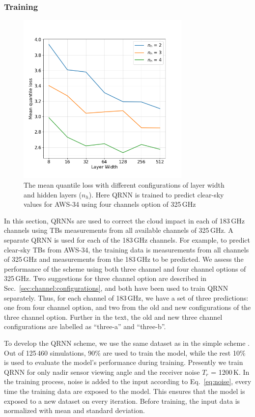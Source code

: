 \documentclass[12pt]{article}
\begin{document}
\subsubsection{Training}
%  
\label{sec:qrnn:training}
\begin{figure}[!tb]
	\centering
	\includegraphics[height=85mm]{quantile_loss.png}
	\caption{The mean quantile loss with different configurations of layer width and hidden layers ($n_h$). Here QRNN is trained to predict clear-sky values for AWS-34 using four channels option of 325\,GHz}
	\label{fig:quantile_loss}
\end{figure}
In this section, QRNNs are used to correct the cloud impact in each of 183\,GHz
channels using TBs measurements from all available channels of 325\,GHz. A
separate QRNN is used for each of the 183\,GHz channels. For example, to
predict clear-sky TBs from AWS-34, the training data is measurements from all
channels of 325\,GHz and measurements from the 183\,GHz to be predicted. We
assess the performance of the scheme using both three channel and four channel
options of 325\,GHz. Two suggestions for three channel option are described in
Sec.~\ref{sec:channel:configurations}, and both have been used to train QRNN
separately. Thus, for each channel of 183\,GHz, we have a set of three
predictions: one from four channel option, and two from the old and new
configurations of the three channel option. Further in the text, the old and
new three channel configurations are labelled as ``three-a'' and ``three-b''.

To develop the QRNN scheme, we use the same dataset as in the
simple scheme . Out of 125\,460 simulations, 90\% are used to train the model,
while the rest 10\% is used to evaluate the model's performance during
training. Presently we train QRNN for only nadir sensor viewing angle and the
receiver noise $T_r$ = 1200\,K. In the training process, noise is added to the
input according to Eq.~\ref{eq:noise}, every time the training data are exposed
to the model. This ensures that the model is exposed to a new dataset on every
iteration. Before training, the input data is normalized with mean and standard
deviation.
\end{document}
